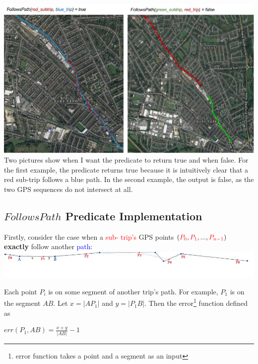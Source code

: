 \documentclass[12pt,a4paper,oneside,openright]{report}
\begin{document}
\includegraphics[width=\textwidth, scale=1.2]{figs/follows_path.jpg} \\

Two pictures show when I want the predicate to return true and when false.
For the first example, the predicate returns true because it is intuitively
clear that a red sub-trip follows a blue path. In the second example, the
output is false, as the two GPS sequences do not intersect at all.

\newpage

\subsection{$FollowsPath$ Predicate Implementation}

Firstly, consider the case when a \textcolor{red}{sub- trip's} GPS points
$(\textcolor{red}{P_0}, \textcolor{red}{P_1}, ..., \textcolor{red}{P_{n-1}})$
\textbf{exactly} follow another \textcolor{blue}{path}: \\

\includegraphics[width=\textwidth]{figs/follows_exactly.jpg}

Each point $P_i$ is on some segment of another trip's path.
For example, $P_1$ is on the segment $AB$.
Let $x = |AP_1|$ and $y = |P_1B|$. Then the
error\footnote{error function takes a point and a segment as an input} function
defined as \\

\begin{centering}
$err(P_1, AB) = \frac{x + y}{|AB|} - 1$ \\
\end{centering}
\end{document}

